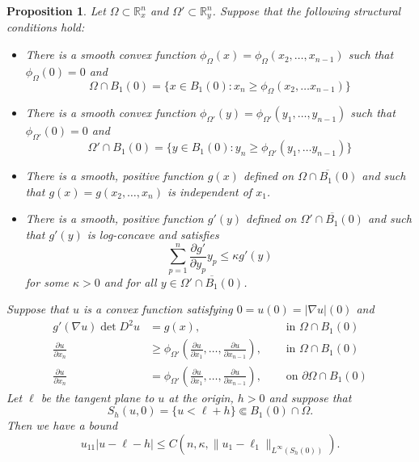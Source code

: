 \documentclass[10pt,a4paper]{amsart}
\newtheorem{prop}{Proposition}[section]
\newcommand{\del}{\partial}
\numberwithin{equation}{section}
\begin{document}
\setcounter{section}{7}
\setcounter{equation}{0}
\setcounter{claim}{0}
\setcounter{conj}{0}
\setcounter{corr}{0}
\setcounter{defn}{0}
\setcounter{example}{0}
\setcounter{lem}{0}
\setcounter{prop}{0}
\setcounter{ques}{1}
\setcounter{remark}{0}
\setcounter{theorem}{0}
\begin{prop}\label{prop: VeryGenPog}
Let $\Omega\subset \mathbb{R}^{n}_{x}$ and $ \Omega' \subset \mathbb{R}_y^n$.  Suppose that the following structural conditions hold: 
\begin{itemize}
    \item[(i)] There is a smooth convex function $\phi_\Omega(x) =\phi_\Omega(x_2,\ldots, x_{n-1})$ such that $\phi_\Omega(0)=0$ and
    \[
    \Omega \cap B_1(0) = \{ x\in B_1(0) : x_n \geq \phi_\Omega(x_2,\ldots x_{n-1})\}
    \]
    \item[(ii)] There is a smooth convex function $\phi_{\Omega'}(y)=\phi_{\Omega'}(y_1,\ldots, y_{n-1})$ such that $\phi_{\Omega'}(0)=0$ and
    \[
    \Omega'\cap B_1(0) =  \{ y\in B_1(0) : y_n \geq \phi_{\Omega'}(y_1,\ldots y_{n-1})\}
    \]
    \item[(iii)] There is a smooth, positive function $g(x)$ defined on $\overline{\Omega\cap B_1(0)} $ and such that $g(x)=g(x_2,\ldots,x_n)$ is independent of $x_1$.
    \item[(iv)]There is a smooth, positive function $g'(y)$ defined on $\overline{\Omega'\cap B_1(0)} $ and such that $g'(y)$ is log-concave and satisfies
    \[
    \sum_{p=1}^{n}\frac{\del g'}{\del y_p}y_p\leq \kappa g'(y)
    \]
    for some $\kappa >0$ and for all $y\in \overline{\Omega'\cap B_1(0)}$.
\end{itemize}
Suppose that $u$ is a convex function satisfying $0 = u(0) = |\nabla u|(0)$ and 
\[
\begin{aligned}
g'(\nabla u)\det D^2u &= g(x),& \quad \text{ in } \Omega \cap B_1(0)\\
\frac{\del u}{\del x_n} &\geq \phi_{\Omega'}(\frac{\del u}{\del x_1}, \ldots, \frac{\del u}{\del x_{n-1}}),& \quad \text{ in } \Omega \cap B_1(0)\\
\frac{\del u}{\del x_n} &= \phi_{\Omega'}(\frac{\del u}{\del x_1}, \ldots, \frac{\del u}{\del x_{n-1}}),& \quad \text{ on } \del\Omega \cap B_1(0)
\end{aligned}
\]
Let $\ell$ be the tangent plane to $u$ at the origin, $h>0$ and suppose that
\[
S_{h}(u,0) = \{u< \ell+h\} \Subset B_1(0)\cap \Omega.
\]
Then we have a bound
\[
u_{11}|u-\ell-h| \leq C(n,\kappa, \|u_{1}-\ell_{1}\|_{L^{\infty}(S_{h}(0))}). 
\]
\end{prop}
\end{document}
